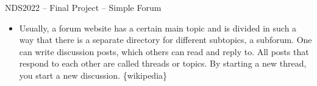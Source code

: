﻿\begin{frame}{NDS2022 -- Final Project -- \alert{Simple Forum}}
  \begin{itemize}
    \item Usually, a forum website has a certain main topic and is divided in such a way that there is a separate directory for different subtopics, a subforum. One can write discussion posts, which others can read and reply to. All posts that respond to each other are called threads or topics. By starting a new thread, you start a new discussion. {\tiny\{wikipedia\}}
  \end{itemize}
\end{frame}
